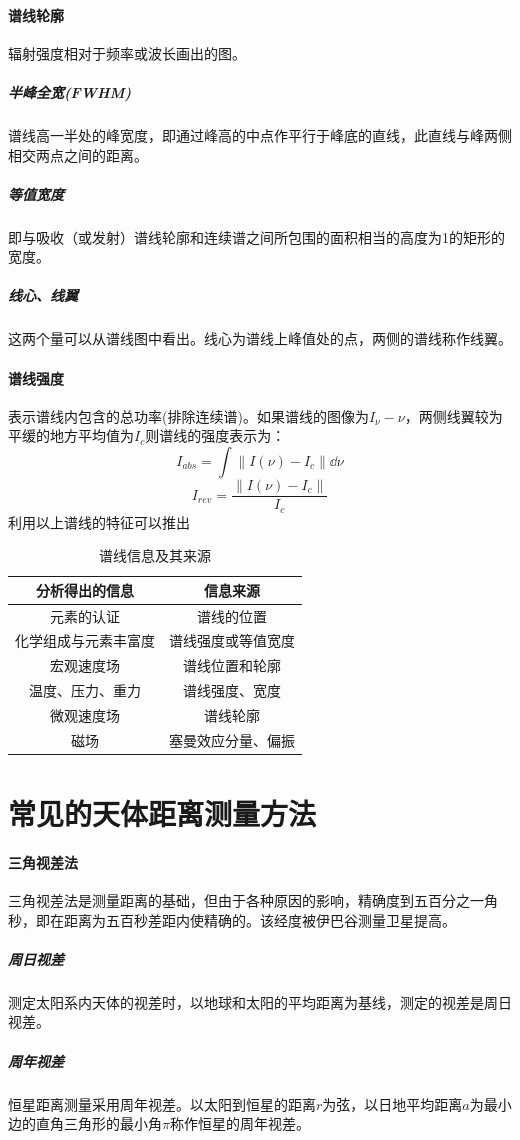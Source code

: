 \paragraph{谱线轮廓}辐射强度相对于频率或波长画出的图。
\subparagraph{半峰全宽(FWHM)}谱线高一半处的峰宽度，即通过峰高的中点作平行于峰底的直线，此直线与峰两侧相交两点之间的距离。
\subparagraph{等值宽度}即与吸收（或发射）谱线轮廓和连续谱之间所包围的面积相当的高度为1的矩形的宽度。
\subparagraph{线心、线翼}这两个量可以从谱线图中看出。线心为谱线上峰值处的点，两侧的谱线称作线翼。
\paragraph{谱线强度}表示谱线内包含的总功率(排除连续谱)。如果谱线的图像为$I_{\nu}-\nu$，两侧线翼较为平缓的地方平均值为$I_{c}$则谱线的强度表示为：
\begin{equation}
	I_{abs}=\int\left\|I(\nu)-I_{c}\right\|\dd \nu
\end{equation}
\begin{equation}
	I_{rev}=\frac{\left\|I(\nu)-I_{c}\right\|}{I_{c}}
\end{equation}
\noindent 利用以上谱线的特征可以推出
\begin{table}[!htbp]
	\centering
	\caption{谱线信息及其来源}
	\begin{tabular}{|c|c|}
		\hline
		分析得出的信息&信息来源\\
		\hline
		元素的认证&谱线的位置\\
		\hline
		化学组成与元素丰富度&谱线强度或等值宽度\\
		\hline
		宏观速度场&谱线位置和轮廓\\
		\hline
		温度、压力、重力&谱线强度、宽度\\
		\hline
		微观速度场&谱线轮廓\\
		\hline
		磁场&塞曼效应分量、偏振\\
		\hline
	\end{tabular}
\end{table}
\section{常见的天体距离测量方法}
\paragraph{三角视差法}
三角视差法是测量距离的基础，但由于各种原因的影响，精确度到五百分之一角秒，即在距离为五百秒差距内使精确的。该经度被伊巴谷测量卫星提高。
\subparagraph{周日视差}测定太阳系内天体的视差时，以地球和太阳的平均距离为基线，测定的视差是周日视差。
\subparagraph{周年视差}恒星距离测量采用周年视差。以太阳到恒星的距离$r$为弦，以日地平均距离$a$为最小边的直角三角形的最小角$\pi$称作恒星的周年视差。
